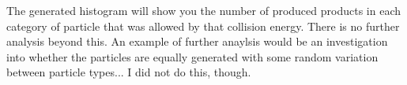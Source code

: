 \documentclass[11pt]{article}
\begin{document}
    The generated histogram will show you the number of produced products in each category of particle that was allowed by that collision energy. There is no further analysis beyond this. An example of further anaylsis would be an investigation into whether the particles are equally generated with some random variation between particle types... I did not do this, though.
  
\end{document}
